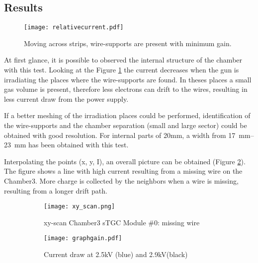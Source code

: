 \subsection{Results}

\begin{figure}[ht]
	\centering
		\hspace*{\fill}
	\texttt{[image: relativecurrent.pdf]}
		\hspace*{\fill}
	\caption{Moving across strips, wire-supports are present with minimum gain.}\label{fig:structure}
\end{figure}

At first glance, it is possible to observed the internal structure of the chamber with this test. Looking at the Figure
\ref{fig:structure} the current decreases when the gun is irradiating the places where the wire-supports are found. In
theses places a small gas volume is present, therefore less electrons can drift to the wires, resulting in less current
draw from the power supply.\par

If a better meshing of the irradiation places could be performed, identification of the wire-supports and the chamber
separation (small and large sector) could be obtained with good resolution. For internal parts of 20mm, a width from
\SIrange{17}{23}{mm} has been obtained with this test.\par

Interpolating the points (x, y, I), an overall picture can be obtained (Figure \ref{fig:xyscan}). The figure shows a line
with high current resulting from a missing wire on the Chamber3. More charge is collected by the neighbors when a wire
is missing, resulting from a longer drift path.\par

\begin{figure}[ht]
		\centering
		\hspace*{\fill}
		\begin{subfigure}[b]{0.45\textwidth}
			\centering
			\texttt{[image: xy\_scan.png]}
			\caption{xy-scan Chamber3 sTGC Module \#0: missing wire}\label{fig:xyscan}
		\end{subfigure}
		\hfill
		\begin{subfigure}[b]{0.45\textwidth}
			\centering
			\texttt{[image: graphgain.pdf]}
			\caption{Current draw at 2.5kV (blue) and 2.9kV(black)}\label{fig:draw}
		\end{subfigure}
		\hspace*{\fill}
		\caption{ }\label{}
\end{figure}


